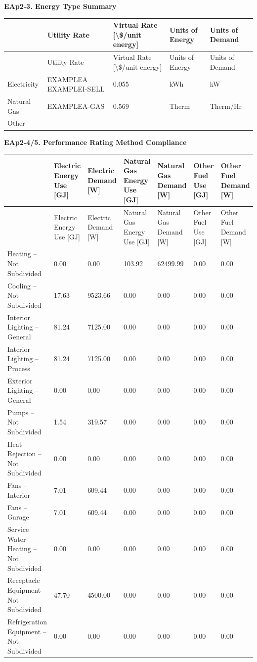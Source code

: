 \textbf{EAp2-3. Energy Type Summary}

\begin{longtable}[c]{>{\raggedright}p{1.2in}>{\raggedright}p{1.2in}>{\raggedright}p{1.2in}>{\raggedright}p{1.2in}>{\raggedright}p{1.2in}}
\toprule
 & Utility Rate & Virtual Rate [\textbackslash\$/unit energy] & Units of Energy & Units of Demand \tabularnewline
\midrule
\endfirsthead

\toprule
 & Utility Rate & Virtual Rate [\textbackslash\$/unit energy] & Units of Energy & Units of Demand \tabularnewline
\midrule
\endhead

Electricity & EXAMPLEA EXAMPLEI-SELL & 0.055 & kWh & kW \tabularnewline
Natural Gas & EXAMPLEA-GAS & 0.569 & Therm & Therm/Hr \tabularnewline
Other & ~ & ~ & ~ & ~ \tabularnewline
\bottomrule
\end{longtable}

\textbf{EAp2-4/5. Performance Rating Method Compliance}

\begin{longtable}[c]{>{\raggedright}p{0.85in}>{\raggedright}p{0.85in}>{\raggedright}p{0.85in}>{\raggedright}p{0.85in}>{\raggedright}p{0.85in}>{\raggedright}p{0.85in}>{\raggedright}p{0.85in}}
\toprule
 & Electric Energy Use [GJ] & Electric Demand [W] & Natural Gas Energy Use [GJ] & Natural Gas Demand [W] & Other Fuel Use [GJ] & Other Fuel Demand [W] \tabularnewline
\midrule
\endfirsthead

\toprule
 & Electric Energy Use [GJ] & Electric Demand [W] & Natural Gas Energy Use [GJ] & Natural Gas Demand [W] & Other Fuel Use [GJ] & Other Fuel Demand [W] \tabularnewline
\midrule
\endhead

Heating -- Not Subdivided  & 0.00 & 0.00 & 103.92 & 62499.99 & 0.00 & 0.00 \tabularnewline
Cooling -- Not Subdivided  & 17.63 & 9523.66 & 0.00 & 0.00 & 0.00 & 0.00 \tabularnewline
Interior Lighting -- General & 81.24 & 7125.00 & 0.00 & 0.00 & 0.00 & 0.00 \tabularnewline
Interior Lighting -- Process & 81.24 & 7125.00 & 0.00 & 0.00 & 0.00 & 0.00 \tabularnewline
Exterior Lighting -- General  & 0.00 & 0.00 & 0.00 & 0.00 & 0.00 & 0.00 \tabularnewline
Pumps -- Not Subdivided  & 1.54 & 319.57 & 0.00 & 0.00 & 0.00 & 0.00 \tabularnewline
Heat Rejection -- Not Subdivided  & 0.00 & 0.00 & 0.00 & 0.00 & 0.00 & 0.00 \tabularnewline
Fans -- Interior  & 7.01 & 609.44 & 0.00 & 0.00 & 0.00 & 0.00 \tabularnewline
Fans -- Garage  & 7.01 & 609.44 & 0.00 & 0.00 & 0.00 & 0.00 \tabularnewline
Service Water Heating  -- Not Subdivided & 0.00 & 0.00 & 0.00 & 0.00 & 0.00 & 0.00 \tabularnewline
Receptacle Equipment - Not Subdivided& 47.70 & 4500.00 & 0.00 & 0.00 & 0.00 & 0.00 \tabularnewline
Refrigeration Equipment -- Not Subdivided & 0.00 & 0.00 & 0.00 & 0.00 & 0.00 & 0.00 \tabularnewline
\bottomrule
\end{longtable}

